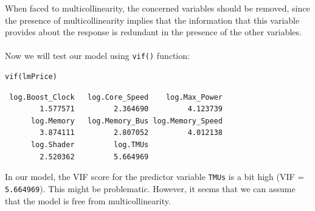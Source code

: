 \documentclass[a4paper]{article}
\begin{document}
When faced to multicollinearity, the concerned variables should be removed, since the presence of multicollinearity implies that the information that this variable provides about the response is redundant in the presence of the other variables.\\\\
Now we will test our model using \verb|vif()| function:
\begin{mdframed}[leftline=false,rightline=false,backgroundcolor=lightblue!10,nobreak=false]
    \begin{verbatim}
vif(lmPrice)
    \end{verbatim}
\end{mdframed}
\begin{lstlisting}
 log.Boost_Clock   log.Core_Speed    log.Max_Power 
        1.577571         2.364690         4.123739 
      log.Memory   log.Memory_Bus log.Memory_Speed 
        3.874111         2.807052         4.012138 
      log.Shader         log.TMUs 
        2.520362         5.664969 
\end{lstlisting}
In our model, the VIF score for the predictor variable \verb|TMUs| is a bit high (VIF = \verb|5.664969|). This might be problematic. However, it seems that we can assume that the model is free from multicollinearity.
\end{document}
